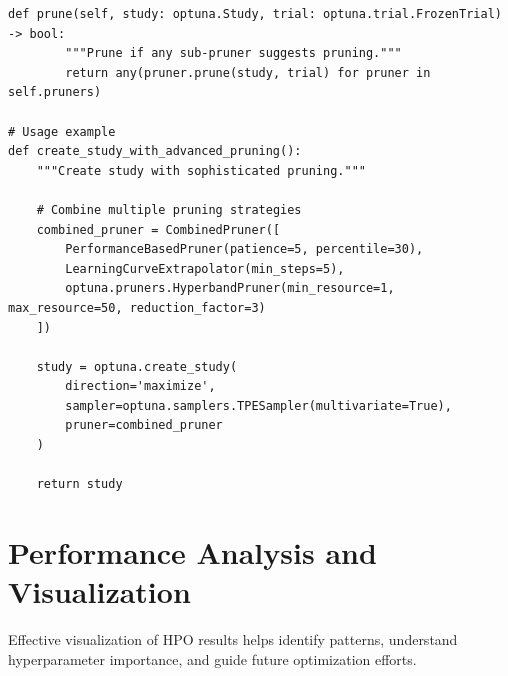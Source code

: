 \begin{lstlisting}[style=python, caption=Custom pruning strategies]
    def prune(self, study: optuna.Study, trial: optuna.trial.FrozenTrial) -> bool:
        """Prune if any sub-pruner suggests pruning."""
        return any(pruner.prune(study, trial) for pruner in self.pruners)

# Usage example
def create_study_with_advanced_pruning():
    """Create study with sophisticated pruning."""

    # Combine multiple pruning strategies
    combined_pruner = CombinedPruner([
        PerformanceBasedPruner(patience=5, percentile=30),
        LearningCurveExtrapolator(min_steps=5),
        optuna.pruners.HyperbandPruner(min_resource=1, max_resource=50, reduction_factor=3)
    ])

    study = optuna.create_study(
        direction='maximize',
        sampler=optuna.samplers.TPESampler(multivariate=True),
        pruner=combined_pruner
    )

    return study
\end{lstlisting}

\section{Performance Analysis and Visualization}

Effective visualization of HPO results helps identify patterns, understand hyperparameter importance, and guide future optimization efforts.

